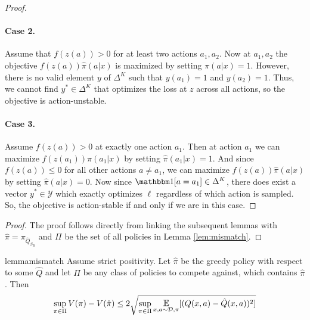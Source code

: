 \begin{subappendices}
\begin{proof}
\paragraph{Case 2.} Assume that $ f(z(a)) > 0 $ for at least two actions $ a_1, a_2$. Now at $ a_1, a_2$ the objective $f(z(a))\hat \pi(a|x)$ is maximized by setting $ \pi(a|x) = 1$. However, there is no valid element $ y $ of $ \Delta^K$ such that $ y(a_1) = 1$ and $y(a_2) = 1$. Thus, we cannot find $ y^* \in \Delta^K$ that optimizes the loss at $ z $ across all actions, so the objective is action-unstable.

\paragraph{Case 3.} Assume $f(z(a)) > 0$ at exactly one action $ a_1$. Then at action $ a_1$ we can maximize $ f(z(a_1))\hat \pi(a_1|x)$ by setting $ \hat\pi(a_1|x) = 1$. And since $ f(z(a)) \leq 0$ for all other actions $ a \neq a_1$, we can maximize $ f(z(a))\hat \pi(a|x)$ by setting $ \hat\pi(a|x) = 0$. Now since $ \one[a = a_1] \in \Delta^K$, there does exist a vector $ y^* \in \mathcal{Y}$ which exactly optimizes $ \ell$ regardless of which action is sampled. So, the objective is action-stable if and only if we are in this case.
\end{proof}




\label{app:value}

\reduction*

\begin{proof}
The proof follows directly from linking the subsequent lemmas with $ \hat \pi = \pi_{\hat Q_{S_B}}$ and $ \Pi$ be the set of all policies in Lemma \ref{lem:mismatch}.
\end{proof}



\begin{restatable}{lemma}{mismatch}\label{lem:mismatch}
Assume strict positivity. Let $\hat \pi$ be the greedy policy with respect to some $ \hat Q $ and let $ \Pi$ be any class of policies to compete against, which contains $ \hat \pi$. Then
\begin{align}
    \sup_{\pi\in \Pi} V(\pi) - V(\hat\pi) \leq 2 \sqrt{\sup_{\pi\in \Pi} \E_{x,a \sim \mathcal{D}, \pi}[ (Q(x,a) - \hat Q(x,a))^2]}
\end{align}
\end{restatable}



\end{subappendices}
